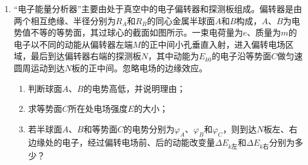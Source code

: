 \begin{enumerate}[leftmargin=0em]

\newpage
\item
{}
“电子能量分析器”主要由处于真空中的电子偏转器和探测板组成。偏转器是由两个相互绝缘、半径分别为$ R_A $和$ R_B $的同心金属半球面$ A $和$ B $构成，$ A $、$ B $为电势值不等的等势面，其过球心的截面如图所示。一束电荷量为$ e $、质量为$ m $的电子以不同的动能从偏转器左端$ M $的正中间小孔垂直入射，进入偏转电场区域，最后到达偏转器右端的探测板$ N $，其中动能为$ E_{k0} $的电子沿等势面$ C $做匀速圆周运动到达$ N $板的正中间。忽略电场的边缘效应。
\begin{enumerate}
\renewcommand{\labelenumi}{\arabic{enumi}.}
\item
判断球面$ A $、$ B $的电势高低，并说明理由；
\item 
求等势面$ C $所在处电场强度$ E $的大小；
\item 
若半球面$ A $、$ B $和等势面$ C $的电势分别为$ \varphi _ A $、$ \varphi _B $和$ \varphi _C $，则到达$ N $板左、右边缘处的电子，经过偏转电场前、后的动能改变量$ \Delta E_{k\text{左}} $和$ \Delta E_{k\text{右}} $分别为多少？



\end{enumerate}
\begin{figure}[h!]
\flushright

\end{figure}



\end{enumerate}
